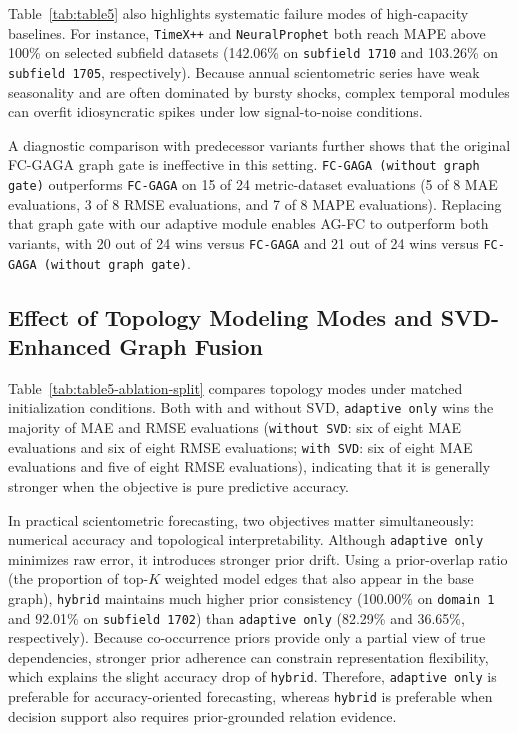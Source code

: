 \documentclass[runningheads]{llncs}
\begin{document}
Table~\ref{tab:table5} also highlights systematic failure modes of high-capacity baselines. For instance, \texttt{TimeX++} and \texttt{NeuralProphet} both reach MAPE above 100\% on selected subfield datasets (142.06\% on \texttt{subfield 1710} and 103.26\% on \texttt{subfield 1705}, respectively). Because annual scientometric series have weak seasonality and are often dominated by bursty shocks, complex temporal modules can overfit idiosyncratic spikes under low signal-to-noise conditions.

A diagnostic comparison with predecessor variants further shows that the original FC-GAGA graph gate is ineffective in this setting. \texttt{FC-GAGA (without graph gate)} outperforms \texttt{FC-GAGA} on 15 of 24 metric-dataset evaluations (5 of 8 MAE evaluations, 3 of 8 RMSE evaluations, and 7 of 8 MAPE evaluations). Replacing that graph gate with our adaptive module enables AG-FC to outperform both variants, with 20 out of 24 wins versus \texttt{FC-GAGA} and 21 out of 24 wins versus \texttt{FC-GAGA (without graph gate)}.

\subsection{Effect of Topology Modeling Modes and SVD-Enhanced Graph Fusion}

Table~\ref{tab:table5-ablation-split} compares topology modes under matched initialization conditions. Both with and without SVD, \texttt{adaptive only} wins the majority of MAE and RMSE evaluations (\texttt{without SVD}: six of eight MAE evaluations and six of eight RMSE evaluations; \texttt{with SVD}: six of eight MAE evaluations and five of eight RMSE evaluations), indicating that it is generally stronger when the objective is pure predictive accuracy.

In practical scientometric forecasting, two objectives matter simultaneously: numerical accuracy and topological interpretability. Although \texttt{adaptive only} minimizes raw error, it introduces stronger prior drift. Using a prior-overlap ratio (the proportion of top-$K$ weighted model edges that also appear in the base graph), \texttt{hybrid} maintains much higher prior consistency (100.00\% on \texttt{domain 1} and 92.01\% on \texttt{subfield 1702}) than \texttt{adaptive only} (82.29\% and 36.65\%, respectively). Because co-occurrence priors provide only a partial view of true dependencies, stronger prior adherence can constrain representation flexibility, which explains the slight accuracy drop of \texttt{hybrid}. Therefore, \texttt{adaptive only} is preferable for accuracy-oriented forecasting, whereas \texttt{hybrid} is preferable when decision support also requires prior-grounded relation evidence.
\end{document}
